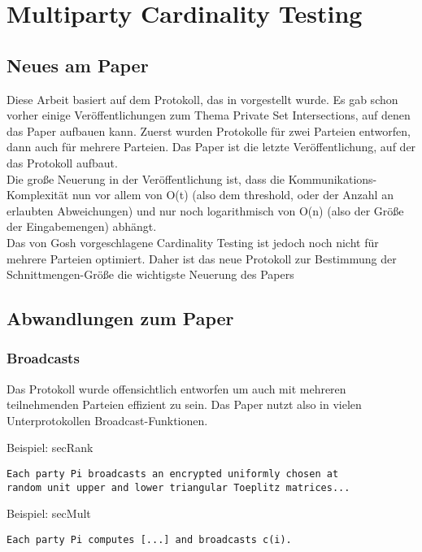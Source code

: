 \chapter{Multiparty Cardinality Testing}


\section{Neues am Paper}
Diese Arbeit basiert auf dem Protokoll, das in \cite{Doettling2021} vorgestellt wurde. Es gab schon vorher einige Veröffentlichungen zum Thema Private Set Intersections, auf denen das Paper aufbauen kann. Zuerst wurden Protokolle für zwei Parteien entworfen, dann auch für mehrere Parteien. Das Paper
\cite{Ghosh2019} ist die letzte Veröffentlichung, auf der das Protokoll aufbaut.\\
Die große Neuerung in der Veröffentlichung \cite{Ghosh2019} ist, dass die Kommunikations-Komplexität nun vor allem von O(t) (also dem threshold, oder der Anzahl an erlaubten Abweichungen) und nur noch logarithmisch von O(n) (also der Größe der Eingabemengen) abhängt. \cite{Ghosh2019}\\
Das von Gosh vorgeschlagene Cardinality Testing ist jedoch noch nicht  für mehrere Parteien optimiert. Daher ist das neue Protokoll zur Bestimmung der Schnittmengen-Größe die wichtigste Neuerung des Papers \cite{Doettling2021}


\section{Abwandlungen zum Paper} \label{Änderungen}
\subsection{Broadcasts}
Das Protokoll wurde offensichtlich entworfen um auch mit mehreren teilnehmenden Parteien effizient zu sein.
Das Paper \cite{Doettling2021} nutzt also in vielen Unterprotokollen Broadcast-Funktionen.

Beispiel: secRank \cite{Doettling2021}
\begin{lstlisting}[firstnumber=1]
Each party Pi broadcasts an encrypted uniformly chosen at
random unit upper and lower triangular Toeplitz matrices...
\end{lstlisting}

Beispiel: secMult \cite{Doettling2021}
\begin{lstlisting}[firstnumber=6]
Each party Pi computes [...] and broadcasts c(i).
\end{lstlisting}

